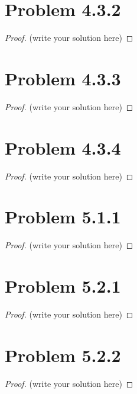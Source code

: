 \documentclass[12pt]{article}
\begin{document}
\section{Problem 4.3.2}

\begin{proof}
	(write your solution here)
\end{proof}

\newpage 

\section{Problem 4.3.3}

\begin{proof}
	(write your solution here)
\end{proof}

\newpage 

\section{Problem 4.3.4}

\begin{proof}
	(write your solution here)
\end{proof}

\newpage 

\section{Problem 5.1.1}

\begin{proof}
	(write your solution here)
\end{proof}

\newpage 

\section{Problem 5.2.1}

\begin{proof}
	(write your solution here)
\end{proof}

\newpage 

\section{Problem 5.2.2}

\begin{proof}
	(write your solution here)
\end{proof}
\end{document}
